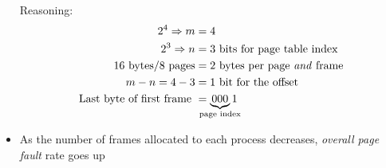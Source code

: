 \documentclass[a4paper]{article}
\begin{document}
\begin{multicols*}{2}
\begin{itemize}
              Reasoning:
              \vspace*{-2em}
              \begin{align*}
                  2^4 \Rightarrow m                  & = 4                                                \\
                  2^3 \Rightarrow n                  & = 3 \text{ bits for page table index}              \\
                  16 \text{ bytes} / 8 \text{ pages} & = 2 \text{ bytes per page \emph{and} frame}        \\
                  m - n = 4 - 3                      & = 1 \text{ bit}       \text{ for the offset}       \\
                  \text{Last byte of first frame }   & = \underbrace{000}_{\mathclap{\text{page index}}}1
              \end{align*}
        \item As the number of frames allocated to each process decreases, \emph{overall page fault} rate goes up
    \end{itemize}
\end{multicols*}
\end{document}
